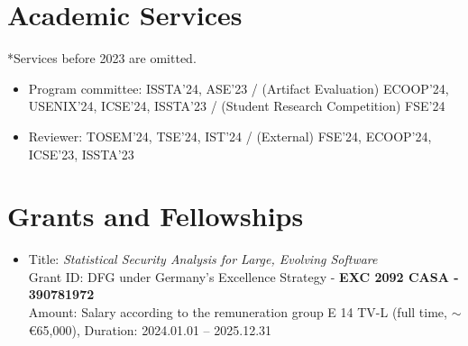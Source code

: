 \documentclass[letterpaper,10pt]{article}
\newcommand{\resumeSubHeadingListEnd}{\end{itemize}}
\begin{document}


\section{Academic Services}
*Services before 2023 are omitted.
\begin{itemize}
  \item Program committee: ISSTA'24, ASE'23 / (Artifact Evaluation) ECOOP'24, USENIX'24, ICSE'24, ISSTA'23 / (Student Research Competition) FSE'24
  \item Reviewer: TOSEM'24, TSE'24, IST'24 / (External) FSE'24, ECOOP'24, ICSE'23, ISSTA'23
\end{itemize}


\section{Grants and Fellowships}
\begin{itemize}
  \item Title: \emph{Statistical Security Analysis for Large, Evolving Software} \\ 
  Grant ID: DFG under Germany's Excellence Strategy - \textbf{EXC 2092 CASA - 390781972} \\ 
  Amount: Salary according to the remuneration group E 14 TV-L (full time, $\sim$ \euro{65,000}), Duration: 2024.01.01 -- 2025.12.31
\end{itemize}
\end{document}
